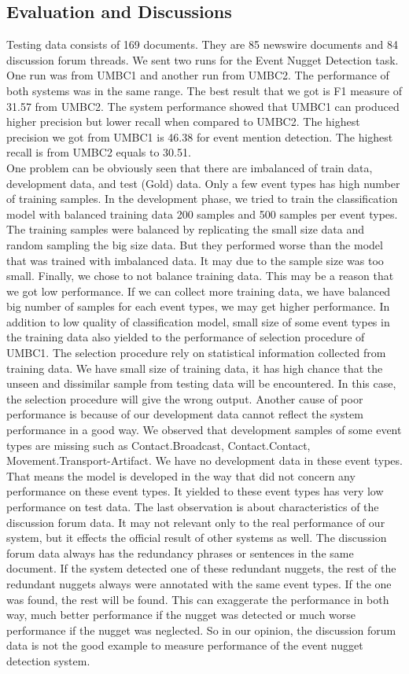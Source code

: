\subsection{Evaluation and Discussions}
\label{evalanddiscussumbcs}
Testing data consists of 169 documents. They are 85 newswire documents and 84 discussion forum threads. We sent two runs for the Event Nugget Detection task. One run was from UMBC1 and another run from UMBC2. The performance of both systems was in the same range. The best result that we got is F1 measure of 31.57 from UMBC2. The system performance showed that UMBC1 can produced higher precision but lower recall when compared to UMBC2. The highest precision we got from UMBC1 is 46.38 for event mention detection. The highest recall is from UMBC2 equals to 30.51. \\
\indent One problem can be obviously seen that there are imbalanced of train data, development data, and test (Gold) data. Only a few event types has high number of training samples. In the development phase, we tried to train the classification model with balanced training data 200 samples and 500 samples per event types. The training samples were balanced by replicating the small size data and random sampling the big size data. But they performed worse than the model that was trained with imbalanced data. It may due to the sample size was too small. Finally, we chose to not balance training data. This may be a reason that we got low performance. If we can collect more training data, we have balanced big number of samples for each event types, we may get higher performance. In addition to low quality of classification model, small size of some event types in the training data also yielded to the performance of selection procedure of UMBC1. The selection procedure rely on statistical information collected from training data. We have small size of training data, it has high chance that the unseen and dissimilar sample from testing data will be encountered. In this case, the selection procedure will give the wrong output. Another cause of poor performance is because of our development data cannot reflect the system performance in a good way. We observed that development samples of some event types are missing such as Contact.Broadcast, Contact.Contact, Movement.Transport-Artifact. We have no development data in these event types. That means the model is developed in the way that did not concern any performance on these event types. It yielded to these event types has very low performance on test data. The last observation is about characteristics of the discussion forum data. It may not relevant only to the real performance of our system, but it effects the official result of other systems as well. The discussion forum data always has the redundancy phrases or sentences in the same document. If the system detected one of these redundant nuggets, the rest of the redundant nuggets always were annotated with the same event types. If the one was found, the rest will be found. This can exaggerate the performance in both way, much better performance if the nugget was detected or much worse performance if the nugget was neglected. So in our opinion, the discussion forum data is not the good example to measure performance of the event nugget detection system.

